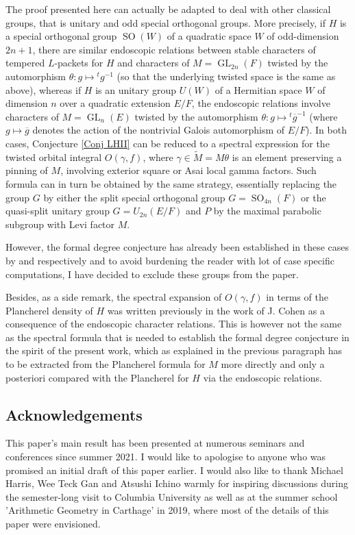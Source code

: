 \documentclass[12pt]{article}
\numberwithin{equation}{section}
\def\tM{\widetilde{M}}
\DeclareMathOperator{\GL}{\mathrm{GL}}
\DeclareMathOperator{\SO}{\mathrm{SO}}
\begin{document}
The proof presented here can actually be adapted to deal with other classical groups, that is unitary and odd special orthogonal groups. More precisely, if $H$ is a special orthogonal group $\SO(W)$ of a quadratic space $W$ of odd-dimension $2n+1$, there are similar endoscopic relations between stable characters of tempered $L$-packets for $H$ and characters of $M=\GL_{2n}(F)$ twisted by the automorphism $\theta: g\mapsto {}^t g^{-1}$ (so that the underlying twisted space is the same as above), whereas if $H$ is an unitary group $U(W)$ of a Hermitian space $W$ of dimension $n$ over a quadratic extension $E/F$, the endoscopic relations involve characters of $M=\GL_n(E)$ twisted by the automorphism $\theta: g\mapsto {}^t \overline{g}^{-1}$ (where $g\mapsto \overline{g}$ denotes the action of the nontrivial Galois automorphism of $E/F$). In both cases, Conjecture \ref{Conj LHII} can be reduced to a spectral expression for the twisted orbital integral $O(\gamma,f)$, where $\gamma\in \tM=M\theta$ is an element preserving a pinning of $M$, involving exterior square or Asai local gamma factors. Such formula can in turn be obtained by the same strategy, essentially replacing the group $G$ by either the split special orthogonal group $G=\SO_{4n}(F)$ or the quasi-split unitary group $G=U_{2n}(E/F)$ and $P$ by the maximal parabolic subgroup with Levi factor $M$.

However, the formal degree conjecture has already been established in these cases by \cite{ILMfd} and \cite{BPPlanch} respectively and to avoid burdening the reader with lot of case specific computations, I have decided to exclude these groups from the paper.

Besides, as a side remark, the spectral expansion of $O(\gamma,f)$ in terms of the Plancherel density of $H$ was written previously in the work of J. Cohen \cite{CohenJ} as a consequence of the endoscopic character relations. This is however not the same as the spectral formula that is needed to establish the formal degree conjecture in the spirit of the present work, which as explained in the previous paragraph has to be extracted from the Plancherel formula for $M$ more directly and only a posteriori compared with the Plancherel for $H$ via the endoscopic relations.

\subsection{Acknowledgements}

This paper's main result has been presented at numerous seminars and conferences since summer 2021. I would like to apologise to anyone who was promised an initial draft of this paper earlier. I would also like to thank Michael Harris, Wee Teck Gan and Atsushi Ichino warmly for inspiring discussions during the semester-long visit to Columbia University as well as at the summer school 'Arithmetic Geometry in Carthage' in 2019, where most of the details of this paper were envisioned.
\end{document}

